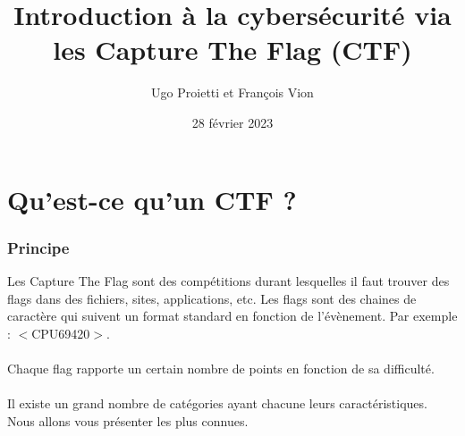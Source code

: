\documentclass{beamer}
\title[Capture The Flag]{Introduction à la cybersécurité via les Capture The Flag (CTF)} %
\author{Ugo Proietti et François Vion} %
\institute[UMONS] %
{
Universtité de Mons \\ %
\medskip
}
\date[]{28 février 2023} %
\begin{document}
\begin{frame}
\titlepage %
\end{frame}

\begin{frame}
\frametitle{} %
\tableofcontents %
\end{frame}


\section{Qu'est-ce qu'un CTF ?} %

\begin{frame}
\frametitle{Principe}

Les Capture The Flag sont des compétitions durant lesquelles il faut trouver des flags dans des fichiers, sites, applications, etc. Les flags sont des chaines de caractère qui suivent un format standard en fonction de l'évènement. Par exemple : $<$CPU69420$>$. \\~\\

Chaque flag rapporte un certain nombre de points en fonction de sa difficulté. \\~\\

Il existe un grand nombre de catégories ayant chacune leurs caractéristiques. Nous allons vous présenter les plus connues.

\end{frame}

\end{document}

